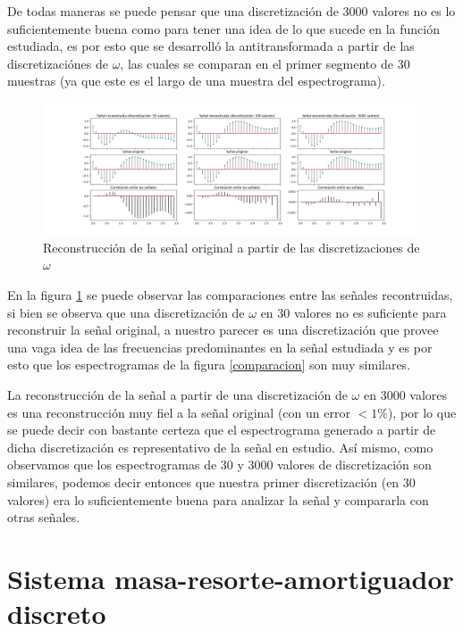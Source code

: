 \documentclass{article}
\begin{document}
De todas maneras se puede pensar que una discretización de 3000 valores no es lo suficientemente buena como para tener una idea de lo que sucede en la función estudiada, es por esto que se desarrolló la antitransformada
a partir de las discretizaciónes de $\omega$, las cuales se comparan en el primer segmento de 30 muestras (ya que este es el largo de una muestra del espectrograma).
	         \begin{figure}[h!]
	            \centering
	            \includegraphics[width=\textwidth]{./Imagenes/antitransformada/comparacion.jpg}
	            \caption{Reconstrucción de la señal original a partir de las discretizaciones de $\omega$}
	            \label{recreacion}
	        \end{figure}
En la figura \ref{recreacion} se puede observar las comparaciones entre las señales recontruidas, si bien se observa que una discretización de $\omega$ en 30 valores no es suficiente para reconstruir la señal original,
a nuestro parecer es una discretización que provee una vaga idea de las frecuencias predominantes en la señal estudiada y es por esto que los espectrogramas de la figura \ref{comparacion} son muy similares.

La reconstrucción de la señal a partir de una discretización de $\omega$ en 3000 valores es una reconstrucción muy fiel a la señal original (con un error $<1\%$), por lo que se puede decir con bastante certeza que el espectrograma generado a partir de dicha discretización es representativo de la señal en estudio.
Así mismo, como observamos que los espectrogramas de 30 y 3000 valores de discretización son similares, podemos decir entonces que nuestra primer discretización (en 30 valores) era lo suficientemente buena para analizar la señal y compararla con otras señales.
	        
\newpage \section{Sistema masa-resorte-amortiguador discreto}
\end{document}
